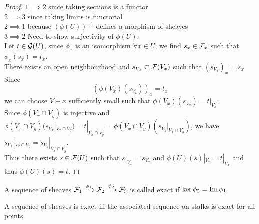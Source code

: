\documentclass[../main.tex]{subfiles}
\begin{document}
\begin{proof}

$1\implies 2$ since taking sections is a functor\\
$2\implies 3$ since taking limits is functorial\\
$2\implies 1$ because $( \phi( U) )^{-1}$ defines a morphism of sheaves\\
$3\implies 2$ Need to show surjectivity of $\phi( U) $.\\
Let $t\in \mathcal{G}( U) $, since $\phi_x$ is an isomorphism $\forall x \in U$, we find $s_x \in \mathcal{F}_x$ such that $\phi_x(s_x)= t_x $.\\
There exists an open neighbourhood and $s_{V_x} \subset \mathcal{F}( V_x) $ such that $( s_{V_x})_x = s_x$\\
Since 
\[ 
	( \phi( V_x) ( s_{V_x} ) ) _x = t_x
\]
we can choose $V+x$ sufficiently small such that $\phi( V_x) ( s_{V_x} ) = t|_{V_x} $.\\
Since $\phi( V_x\cap V_y) $ is injective and $\phi( V_x\cap V_y) ( s_{V_x} |_{V_x\cap V_y} ) = t |_{V_x\cap V_y} = \phi( V_x\cap V_y) ( s_{V_y} |_{V_x\cap V_y} ) $, we have $s_{V_x} |_{V_x\cap V_y} = s_{V_y} |_{V_x\cap V_y} $.\\
Thus there exists $s\in \mathcal{F}( U) $ such that $s|_{V_x} = s_{V_x} $ and $\phi( U) ( s) |_{V_x} = t|_{V_x} $ and thus $\phi( U) ( s) =t$.
\end{proof}
\begin{defn}
	A sequence of sheaves $\mathcal{F}_1\xrightarrow{ \phi_1} \mathcal{F}_2 \xrightarrow{\phi_2} \mathcal{F}_3$  is called exact if $\ker \phi_2= \operatorname{Im} \phi_1$ 
\end{defn}
\begin{crly}
A sequence of sheaves is exact iff the associated sequence on stalks is exact for all points.
\end{crly}











			


	

	
\end{document}
